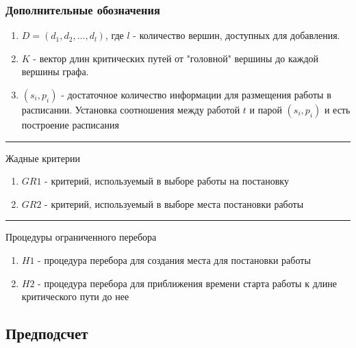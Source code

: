 \begin{frame}
    \frametitle{Дополнительные обозначения}
    \begin{enumerate}
        \item $D= \left( d_1, d_2, \dots, d_l \right)$, где $l$ - количество вершин, доступных для добавления.
        \item $K$ - вектор длин критических путей от "головной" вершины до каждой вершины графа.
        \item $\left( s_i, p_i \right)$ - достаточное количество информации для размещения работы в расписании. Установка соотношения между работой $t$ и парой $\left( s_i, p_i \right)$ и есть построение расписания
    \end{enumerate}
    \hrule
    \vspace{2pt}
    Жадные критерии
    \begin{enumerate}
        \item $GR1$ - критерий, используемый в выборе работы на постановку
        \item $GR2$ - критерий, используемый в выборе места постановки работы
    \end{enumerate}
    \hrule
    \vspace{2pt}
    Процедуры ограниченного перебора
    \begin{enumerate}
        \item $H1$ - процедура перебора для создания места для постановки работы
        \item $H2$ - процедура перебора для приближения времени старта работы к длине критического пути до нее
    \end{enumerate}
\end{frame}


\subsection{Предподсчет}


